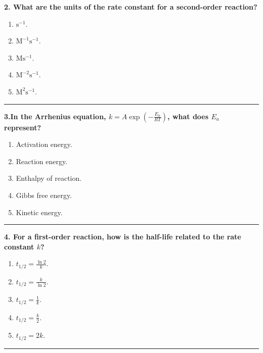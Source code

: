 \documentclass[
  9pt,
]{extbook}
\providecommand{\tightlist}{%
  \setlength{\itemsep}{0pt}\setlength{\parskip}{0pt}}
\theoremstyle{definition}
\theoremstyle{definition}
\theoremstyle{definition}
\theoremstyle{remark}
\begin{document}
\textbf{2. What are the units of the rate constant for a second-order reaction?}

\begin{enumerate}
\def\labelenumi{\alph{enumi}.}
\tightlist
\item
  \(\text{s}^{-1}\).
\item
  \(\text{M}^{-1}\text{s}^{-1}\).
\item
  \(\text{M}\text{s}^{-1}\).
\item
  \(\text{M}^{-2}\text{s}^{-1}\).
\item
  \(\text{M}^2\text{s}^{-1}\).
\end{enumerate}

\begin{center}\rule{0.5\linewidth}{0.5pt}\end{center}

\textbf{3.In the Arrhenius equation, \(k = A\exp(-\frac{E_a}{RT})\), what does \(E_a\) represent?}

\begin{enumerate}
\def\labelenumi{\alph{enumi}.}
\tightlist
\item
  Activation energy.
\item
  Reaction energy.
\item
  Enthalpy of reaction.
\item
  Gibbs free energy.
\item
  Kinetic energy.
\end{enumerate}

\begin{center}\rule{0.5\linewidth}{0.5pt}\end{center}

\textbf{4. For a first-order reaction, how is the half-life related to the rate constant \(k\)?}

\begin{enumerate}
\def\labelenumi{\alph{enumi}.}
\tightlist
\item
  \(t_{1/2} = \frac{\ln 2}{k}\).
\item
  \(t_{1/2} = \frac{k}{\ln 2}\).
\item
  \(t_{1/2} = \frac{1}{k}\).
\item
  \(t_{1/2} = \frac{k}{2}\).
\item
  \(t_{1/2} = 2k\).
\end{enumerate}

\begin{center}\rule{0.5\linewidth}{0.5pt}\end{center}
\end{document}
